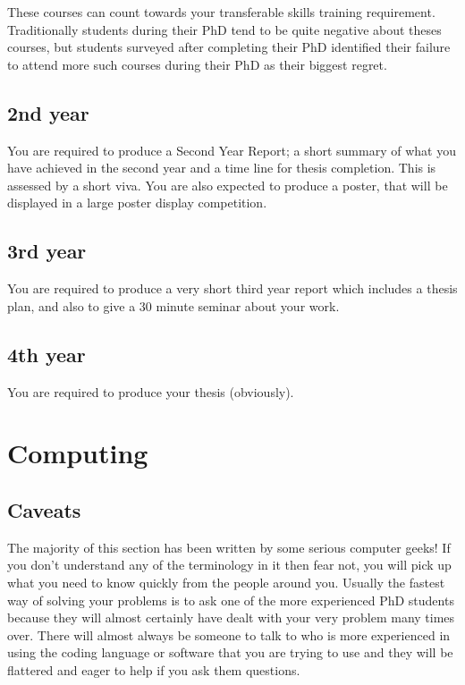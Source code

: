 These courses can count towards your transferable skills training requirement. Traditionally students during their PhD tend to be quite negative about theses courses, but students surveyed after completing their PhD identified their failure to attend more such courses during their PhD as their biggest regret.

\subsection{2nd year}

You are required to produce a Second Year Report; a short summary of what you have achieved in
the second year and a time line for thesis completion. This is assessed by a 
short viva. You are also expected to produce a poster, that will be displayed in a large poster display competition.

\subsection{3rd year}

You are required to produce a very short third year report which includes a thesis plan, and also to give a 30 minute seminar about your work.

\subsection{4th year}

You are required to produce your thesis (obviously).

\section{Computing}

\subsection*{Caveats}

The majority of this section has been written by some serious computer geeks! If you don't understand any of the terminology in it then fear not, you will pick up what you need to know quickly from the people around you. Usually the fastest way of solving your problems is to ask one of the more experienced PhD students because they will almost certainly have dealt with your very problem many times over. There will almost always be someone to talk to who is more experienced in using the coding language or software that you are trying to use and they will be flattered and eager to help if you ask them questions.

